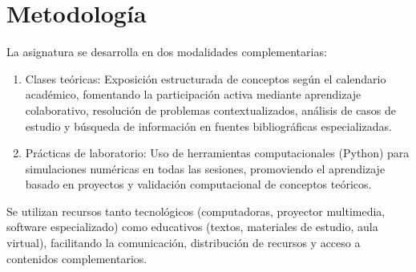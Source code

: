 \section{Metodología}

La asignatura se desarrolla en dos modalidades complementarias:

\begin{enumerate}[label=\arabic*., font=\bfseries, nosep]
	\item

	      Clases teóricas: Exposición estructurada de conceptos según
	      el calendario académico, fomentando la participación activa
	      mediante aprendizaje colaborativo, resolución de problemas
	      contextualizados, análisis de casos de estudio y búsqueda de
	      información en fuentes bibliográficas especializadas.

	\item

	      Prácticas de laboratorio: Uso de herramientas computacionales
	      (Python) para simulaciones numéricas en todas las sesiones,
	      promoviendo el aprendizaje basado en proyectos y validación
	      computacional de conceptos teóricos.
\end{enumerate}

Se utilizan recursos tanto tecnológicos (computadoras, proyector
multimedia, software especializado) como educativos (textos,
materiales de estudio, aula virtual), facilitando la comunicación,
distribución de recursos y acceso a contenidos complementarios.
